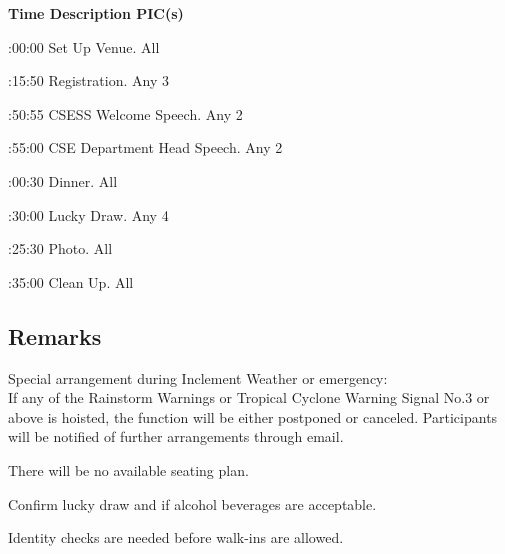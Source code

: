 \setupTABLE[c][1][width=1.25in]
\setupTABLE[c][2][width=3.5in]
\setupTABLE[c][3][width=1.25in]
\bTABLE
\bTABLEhead

\bTR\bTH    \bf{Time}
\eTH\bTH    \bf{Description}
\eTH\bTH    \bf{PIC(s)}
\eTH\eTR

\eTABLEhead
\bTABLEbody

\bTR{}:00:00
\eTD\bTD Set Up Venue.
\eTD\bTD All
\eTD\eTR

\bTR{}:15:50
\eTD\bTD Registration.
\eTD\bTD Any 3
\eTD\eTR

\bTR{}:50:55
\eTD\bTD CSESS Welcome Speech.
\eTD\bTD Any 2
\eTD\eTR

\bTR{}:55:00
\eTD\bTD CSE Department Head Speech.
\eTD\bTD Any 2
\eTD\eTR

\bTR{}:00:30
\eTD\bTD Dinner.
\eTD\bTD All
\eTD\eTR

\bTR{}:30:00
\eTD\bTD Lucky Draw.
\eTD\bTD Any 4
\eTD\eTR

\bTR{}:25:30
\eTD\bTD Photo.
\eTD\bTD All
\eTD\eTR

\bTR{}:35:00
\eTD\bTD Clean Up.
\eTD\bTD All
\eTD\eTR

\eTABLEbody
\eTABLE

\subsection{Remarks}
\startitemize
\item Special arrangement during Inclement Weather or emergency: \\
If any of the Rainstorm Warnings or Tropical Cyclone Warning Signal No.3 or above is hoisted, the function will be either postponed or canceled. Participants will be notified of further arrangements through email.
\item There will be no available seating plan.
\item Confirm lucky draw and if alcohol beverages are acceptable.
\item Identity checks are needed before walk-ins are allowed.
\stopitemize

\stopsection
\pagebreak
